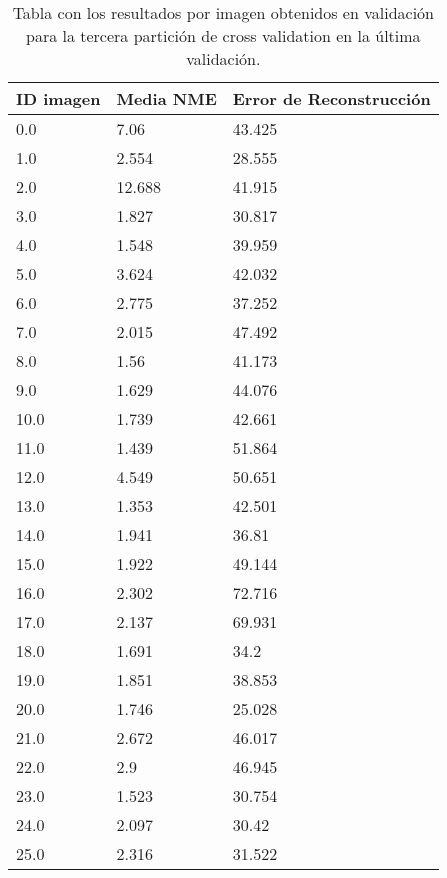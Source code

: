\begin{table}[!ht]
    \centering
    \caption{Tabla con los resultados por imagen obtenidos en validación para la tercera partición de cross validation en la última validación.}
    \begin{tabular}{|l|l|l|}
    \hline
        ID imagen & Media NME & Error de Reconstrucción \\ \hline
        0.0 & 7.06 & 43.425 \\ \hline
        1.0 & 2.554 & 28.555 \\ \hline
        2.0 & 12.688 & 41.915 \\ \hline
        3.0 & 1.827 & 30.817 \\ \hline
        4.0 & 1.548 & 39.959 \\ \hline
        5.0 & 3.624 & 42.032 \\ \hline
        6.0 & 2.775 & 37.252 \\ \hline
        7.0 & 2.015 & 47.492 \\ \hline
        8.0 & 1.56 & 41.173 \\ \hline
        9.0 & 1.629 & 44.076 \\ \hline
        10.0 & 1.739 & 42.661 \\ \hline
        11.0 & 1.439 & 51.864 \\ \hline
        12.0 & 4.549 & 50.651 \\ \hline
        13.0 & 1.353 & 42.501 \\ \hline
        14.0 & 1.941 & 36.81 \\ \hline
        15.0 & 1.922 & 49.144 \\ \hline
        16.0 & 2.302 & 72.716 \\ \hline
        17.0 & 2.137 & 69.931 \\ \hline
        18.0 & 1.691 & 34.2 \\ \hline
        19.0 & 1.851 & 38.853 \\ \hline
        20.0 & 1.746 & 25.028 \\ \hline
        21.0 & 2.672 & 46.017 \\ \hline
        22.0 & 2.9 & 46.945 \\ \hline
        23.0 & 1.523 & 30.754 \\ \hline
        24.0 & 2.097 & 30.42 \\ \hline
        25.0 & 2.316 & 31.522 \\ \hline
    \end{tabular}
    \label{table:Encode_images_3}
\end{table}

